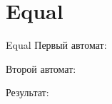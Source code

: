 \section{Equal}
\begin{frame}{Equal}
	Первый автомат:


	Второй автомат:


	Результат:

\end{frame}
